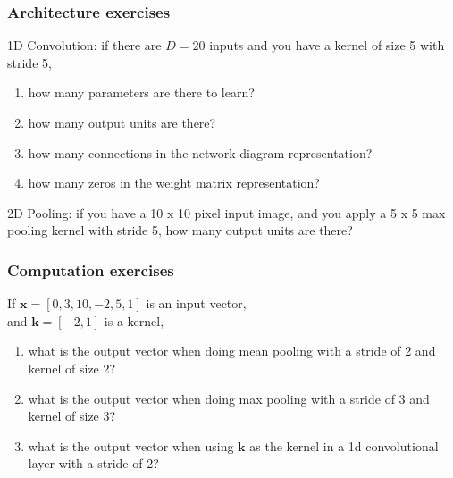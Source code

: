 \documentclass{beamer}
\begin{document}
\begin{frame}
  \frametitle{Architecture exercises}
  1D Convolution: if there are $D=20$ inputs and you have a kernel of
  size 5 with stride 5,
  \begin{enumerate}
  \item how many parameters are there to learn?
  \item how many output units are there?
  \item how many connections in the network diagram
    representation?
  \item how many zeros in the weight matrix
    representation?
  \end{enumerate}
  2D Pooling: if you have a 10 x 10 pixel input image, and you apply a
  5 x 5 max pooling kernel with stride 5, how many output units are
  there?
\end{frame}

\begin{frame}
  \frametitle{Computation exercises}
  If $\mathbf x = [0, 3, 10, -2, 5, 1]$ is an input vector,\\
  and $\mathbf k = [-2, 1]$ is a kernel,\\
  \begin{enumerate}
  \item what is the output vector when doing mean pooling with a
    stride of 2 and kernel of size 2?
  \item what is the output vector when doing max pooling with a stride
    of 3 and kernel of size 3?
  \item what is the output vector when using $\mathbf k$ as the kernel
    in a 1d convolutional layer with a stride of 2?
  \end{enumerate}
\end{frame}
\end{document}
